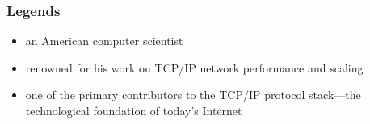 \documentclass{../c-lecture}
\begin{document}
\begin{frame}
  \frametitle{Legends}
  \begin{itemize}
    \item an American computer scientist
    \item renowned for his work on TCP/IP network performance and scaling
    \item one of the primary contributors to the TCP/IP protocol stack—the technological foundation of today’s Internet
  \end{itemize}
\end{frame}
\end{document}
